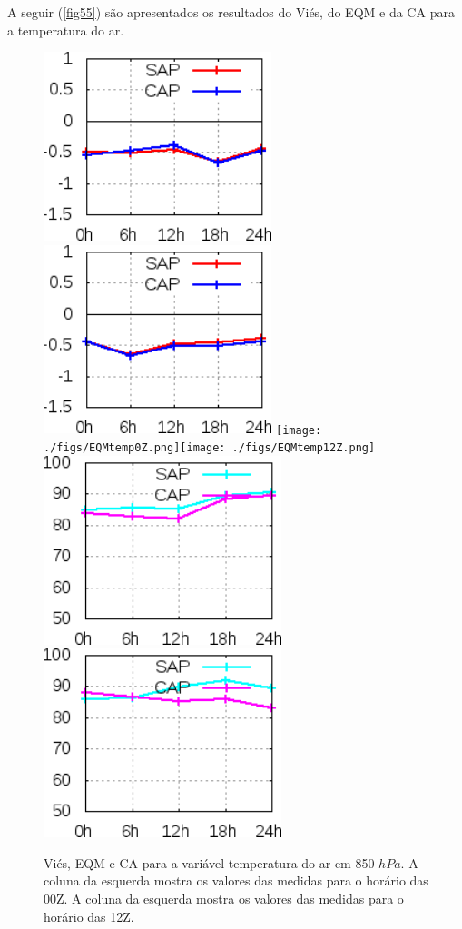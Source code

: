 A seguir (\autoref{fig55}) são apresentados os resultados do Viés, do EQM e da CA para a temperatura do ar.

\begin{figure}[!hbp]
\includegraphics[height=5.5cm]{./figs/VIES850temp0Z.png}\includegraphics[height=5.5cm]{./figs/VIES850temp12Z.png}
\texttt{[image: ./figs/EQMtemp0Z.png]}\texttt{[image: ./figs/EQMtemp12Z.png]}
\includegraphics[height=5.5cm]{./figs/CA850temp0Z.png}\includegraphics[height=5.5cm]{./figs/CA850temp12Z.png}
\caption{Viés, EQM e CA para a variável temperatura do ar em 850 $hPa$. A coluna da esquerda mostra os valores das medidas para o horário das 00Z. A coluna da esquerda mostra os valores das medidas para o horário das 12Z.}
\label{fig55}
\end{figure}

